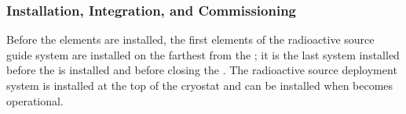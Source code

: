 \subsubsection{Installation, Integration, and Commissioning}
Before the  elements are installed, the first elements of the radioactive source guide system are installed on the \endwall farthest from the ; it is the last system installed
before the  is installed and before closing the . The radioactive source deployment system is installed at the top of the cryostat and can be installed when  becomes operational.

